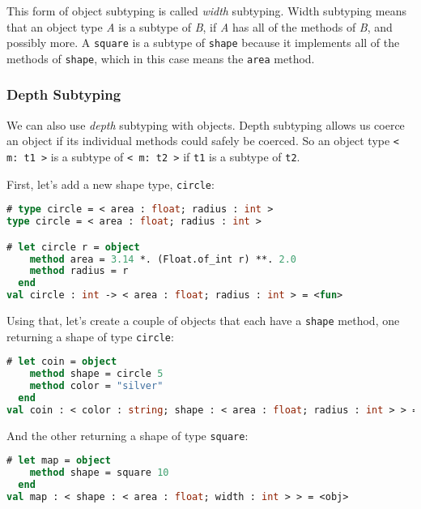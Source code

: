 This form of object subtyping is called \emph{width} subtyping. Width
subtyping means that an object type \emph{A} is a subtype of \emph{B},
if \emph{A} has all of the methods of \emph{B}, and possibly more. A
\passthrough{\lstinline!square!} is a subtype of
\passthrough{\lstinline!shape!} because it implements all of the methods
of \passthrough{\lstinline!shape!}, which in this case means the
\passthrough{\lstinline!area!} method.

\hypertarget{depth-subtyping}{%
\subsubsection{Depth Subtyping}\label{depth-subtyping}}

We can also use \emph{depth} subtyping with objects. Depth subtyping
allows us coerce an object if its individual methods could safely be
coerced. So an object type \passthrough{\lstinline!< m: t1 >!} is a
subtype of \passthrough{\lstinline!< m: t2 >!} if
\passthrough{\lstinline!t1!} is a subtype of
\passthrough{\lstinline!t2!}.

First, let's add a new shape type, \passthrough{\lstinline!circle!}:

\begin{lstlisting}[language=Caml]
# type circle = < area : float; radius : int >
type circle = < area : float; radius : int >

# let circle r = object
    method area = 3.14 *. (Float.of_int r) **. 2.0
    method radius = r
  end
val circle : int -> < area : float; radius : int > = <fun>
\end{lstlisting}

Using that, let's create a couple of objects that each have a
\passthrough{\lstinline!shape!} method, one returning a shape of type
\passthrough{\lstinline!circle!}:

\begin{lstlisting}[language=Caml]
# let coin = object
    method shape = circle 5
    method color = "silver"
  end
val coin : < color : string; shape : < area : float; radius : int > > = <obj>
\end{lstlisting}

And the other returning a shape of type
\passthrough{\lstinline!square!}:

\begin{lstlisting}[language=Caml]
# let map = object
    method shape = square 10
  end
val map : < shape : < area : float; width : int > > = <obj>
\end{lstlisting}

